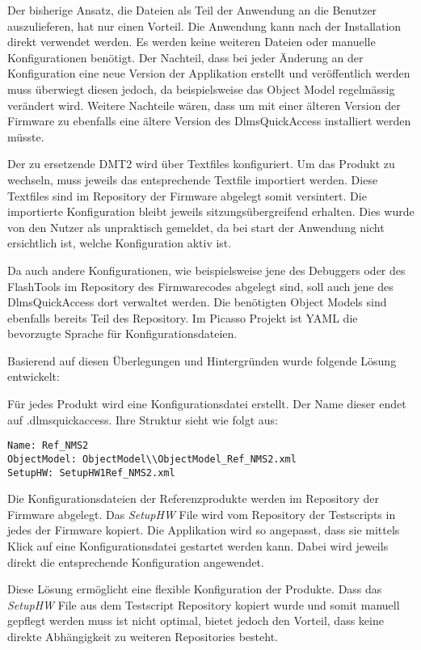 Der bisherige Ansatz, die Dateien als Teil der Anwendung an die Benutzer auszulieferen, hat nur einen Vorteil.
Die Anwendung kann nach der Installation direkt verwendet werden. Es werden keine weiteren Dateien oder manuelle Konfigurationen benötigt.
Der Nachteil, dass bei jeder Änderung an der Konfiguration eine neue Version der Applikation erstellt und veröffentlich werden muss überwiegt diesen jedoch, da beispielsweise das Object Model regelmässig verändert wird.
Weitere Nachteile wären, dass um mit einer älteren Version der Firmware zu ebenfalls eine ältere Version des DlmsQuickAccess installiert werden müsste.

Der zu ersetzende \ac{DMT2} wird über Textfiles konfiguriert.
Um das Produkt zu wechseln, muss jeweils das entsprechende Textfile importiert werden.
Diese Textfiles sind im Repository der Firmware abgelegt somit versintert.
Die importierte Konfiguration bleibt jeweils sitzungsübergreifend erhalten.
Dies wurde von den Nutzer als unpraktisch gemeldet, da bei start der Anwendung nicht ersichtlich ist, welche Konfiguration aktiv ist.

Da auch andere Konfigurationen, wie beispielsweise jene des Debuggers oder des FlashTools im Repository des Firmwarecodes abgelegt sind, soll auch jene des DlmsQuickAccess dort verwaltet werden.
Die benötigten Object Models sind ebenfalls bereits Teil des Repository.
Im Picasso Projekt ist \ac{YAML} die bevorzugte Sprache für Konfigurationsdateien.

Basierend auf diesen Überlegungen und Hintergründen wurde folgende Lösung entwickelt:

Für jedes Produkt wird eine Konfigurationsdatei erstellt.
Der Name dieser endet auf .dlmsquickaccess.
Ihre Struktur sieht wie folgt aus:
\begin{verbatim}
Name: Ref_NMS2
ObjectModel: ObjectModel\\ObjectModel_Ref_NMS2.xml
SetupHW: SetupHW1Ref_NMS2.xml
\end{verbatim}
Die Konfigurationsdateien der Referenzprodukte werden im Repository der Firmware abgelegt.
Das \textit{SetupHW} File wird vom Repository der Testscripts in jedes der Firmware kopiert.
Die Applikation wird so angepasst, dass sie mittels Klick auf eine Konfigurationsdatei gestartet werden kann.
Dabei wird jeweils direkt die entsprechende Konfiguration angewendet.

Diese Lösung ermöglicht eine flexible Konfiguration der Produkte.
Dass das \textit{SetupHW} File aus dem Testscript Repository kopiert wurde und somit manuell gepflegt werden muss ist nicht optimal, bietet jedoch den Vorteil, dass keine direkte Abhängigkeit zu weiteren Repositories besteht.

